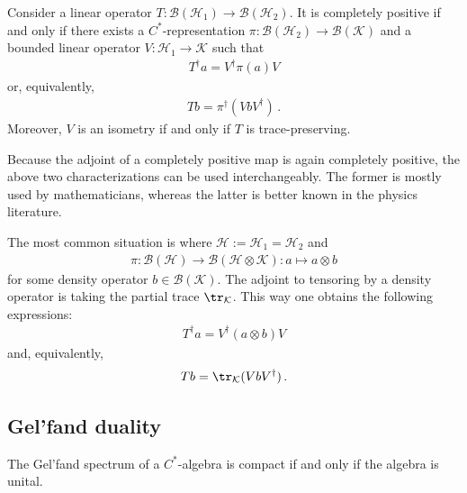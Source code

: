     \begin{theorem}[Stinespring]\label{operators:stinespring}
        Consider a linear operator $T:\mathcal{B}(\mathcal{H}_1)\rightarrow\mathcal{B}(\mathcal{H}_2)$. It is completely positive if and only if there exists a $C^*$-representation $\pi:\mathcal{B}(\mathcal{H}_2)\rightarrow\mathcal{B}(\mathcal{K})$ and a bounded linear operator $V:\mathcal{H}_1\rightarrow\mathcal{K}$ such that
        \begin{gather}
            T^\dagger a = V^\dag\pi(a)V
        \end{gather}
        or, equivalently,
        \begin{gather}
            Tb = \pi^\dagger(VbV^\dagger)\,.
        \end{gather}
        Moreover, $V$ is an isometry if and only if $T$ is trace-preserving.
    \end{theorem}
    \begin{remark}
        Because the adjoint of a completely positive map is again completely positive, the above two characterizations can be used interchangeably. The former is mostly used by mathematicians, whereas the latter is better known in the physics literature.

        The most common situation is where $\mathcal{H}:=\mathcal{H}_1=\mathcal{H}_2$ and
        \begin{gather}
            \pi:\mathcal{B}(\mathcal{H})\rightarrow\mathcal{B}(\mathcal{H}\otimes\mathcal{K}):a\mapsto a\otimes b
        \end{gather}
        for some density operator $b\in\mathcal{B}(\mathcal{K})$. The adjoint to tensoring by a density operator is taking the partial trace $\tr_{\mathcal{K}}$. This way one obtains the following expressions:
        \begin{gather}
            T^\dagger a = V^\dag(a\otimes b)V
        \end{gather}
        and, equivalently,
        \begin{gather}
            Tb = \tr_{\mathcal{K}}(VbV^\dagger)\,.
        \end{gather}
    \end{remark}

\subsection{Gel'fand duality}

    \begin{property}
        The Gel'fand spectrum of a $C^*$-algebra is compact if and only if the algebra is unital.
    \end{property}

